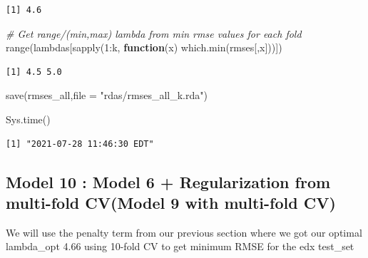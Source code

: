 \documentclass[
]{article}
\newenvironment{Shaded}{}{}
\newcommand{\AttributeTok}[1]{\textcolor[rgb]{0.49,0.56,0.16}{#1}}
\newcommand{\CommentTok}[1]{\textcolor[rgb]{0.38,0.63,0.69}{\textit{#1}}}
\newcommand{\ControlFlowTok}[1]{\textcolor[rgb]{0.00,0.44,0.13}{\textbf{#1}}}
\newcommand{\DecValTok}[1]{\textcolor[rgb]{0.25,0.63,0.44}{#1}}
\newcommand{\FunctionTok}[1]{\textcolor[rgb]{0.02,0.16,0.49}{#1}}
\newcommand{\NormalTok}[1]{#1}
\newcommand{\SpecialCharTok}[1]{\textcolor[rgb]{0.25,0.44,0.63}{#1}}
\newcommand{\StringTok}[1]{\textcolor[rgb]{0.25,0.44,0.63}{#1}}
\begin{document}
\begin{verbatim}
[1] 4.6
\end{verbatim}

\begin{Shaded}
\begin{Highlighting}[]
\CommentTok{\# Get range/(min,max) lambda from min rmse values for each fold}
\FunctionTok{range}\NormalTok{(lambdas[}\FunctionTok{sapply}\NormalTok{(}\DecValTok{1}\SpecialCharTok{:}\NormalTok{k, }\ControlFlowTok{function}\NormalTok{(x) }\FunctionTok{which.min}\NormalTok{(rmses[,x]))])}
\end{Highlighting}
\end{Shaded}

\begin{verbatim}
[1] 4.5 5.0
\end{verbatim}

\begin{Shaded}
\begin{Highlighting}[]
\FunctionTok{save}\NormalTok{(rmses\_all,}\AttributeTok{file =} \StringTok{"rdas/rmses\_all\_k.rda"}\NormalTok{)}

\FunctionTok{Sys.time}\NormalTok{()}
\end{Highlighting}
\end{Shaded}

\begin{verbatim}
[1] "2021-07-28 11:46:30 EDT"
\end{verbatim}

\newpage

\hypertarget{model-10-model-6-regularization-from-multi-fold-cvmodel-9-with-multi-fold-cv}{%
\subsection{Model 10 : Model 6 + Regularization from multi-fold CV(Model
9 with multi-fold
CV)}\label{model-10-model-6-regularization-from-multi-fold-cvmodel-9-with-multi-fold-cv}}

We will use the penalty term from our previous section where we got our
optimal lambda\_opt 4.66 using 10-fold CV to get minimum RMSE for the
edx test\_set
\end{document}
